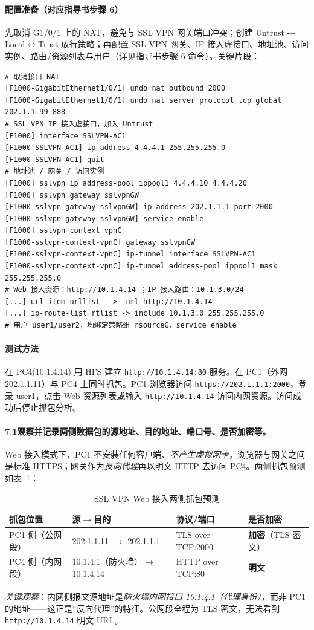 \documentclass[12pt,a4paper]{article}
\begin{document}
\paragraph{配置准备（对应指导书步骤 6）}先取消 G1/0/1 上的 NAT，避免与 SSL VPN 网关端口冲突；创建 Untrust$\leftrightarrow$Local$\leftrightarrow$Trust 放行策略；再配置 SSL VPN 网关、IP 接入虚接口、地址池、访问实例、路由/资源列表与用户（详见指导书步骤 6 命令）。关键片段：
\begin{lstlisting}
# 取消接口 NAT
[F1000-GigabitEthernet1/0/1] undo nat outbound 2000
[F1000-GigabitEthernet1/0/1] undo nat server protocol tcp global 202.1.1.99 888
# SSL VPN IP 接入虚接口，加入 Untrust
[F1000] interface SSLVPN-AC1
[F1000-SSLVPN-AC1] ip address 4.4.4.1 255.255.255.0
[F1000-SSLVPN-AC1] quit
# 地址池 / 网关 / 访问实例
[F1000] sslvpn ip address-pool ippool1 4.4.4.10 4.4.4.20
[F1000] sslvpn gateway sslvpnGW
[F1000-sslvpn-gateway-sslvpnGW] ip address 202.1.1.1 port 2000
[F1000-sslvpn-gateway-sslvpnGW] service enable
[F1000] sslvpn context vpnC
[F1000-sslvpn-context-vpnC] gateway sslvpnGW
[F1000-sslvpn-context-vpnC] ip-tunnel interface SSLVPN-AC1
[F1000-sslvpn-context-vpnC] ip-tunnel address-pool ippool1 mask 255.255.255.0
# Web 接入资源：http://10.1.4.14 ；IP 接入路由：10.1.3.0/24
[...] url-item urllist  ->  url http://10.1.4.14
[...] ip-route-list rtlist -> include 10.1.3.0 255.255.255.0
# 用户 user1/user2，均绑定策略组 rsourceG，service enable
\end{lstlisting}

\paragraph{测试方法}在 PC4(10.1.4.14) 用 HFS 建立 \texttt{http://10.1.4.14:80} 服务。在 PC1（外网 202.1.1.11）与 PC4 上同时抓包。PC1 浏览器访问 \texttt{https://202.1.1.1:2000}，登录 user1，点击 Web 资源列表或输入 \texttt{http://10.1.4.14} 访问内网资源。访问成功后停止抓包分析。

\paragraph{7.1\quad 观察并记录两侧数据包的源地址、目的地址、端口号、是否加密等。}
Web 接入模式下，PC1 不安装任何客户端、\emph{不产生虚拟网卡}，浏览器与网关之间是标准 HTTPS；网关作为\emph{反向代理}再以明文 HTTP 去访问 PC4。两侧抓包预测如表~\ref{tab:webvpn}：
\begin{table}[H]
\centering\caption{SSL VPN Web 接入两侧抓包预测}\label{tab:webvpn}
\small
\begin{tabular}{@{}p{3.2cm}p{3.2cm}p{3.6cm}p{2.4cm}@{}}
\toprule
抓包位置 & 源$\to$目的 & 协议/端口 & 是否加密 \\
\midrule
PC1 侧（公网段） & 202.1.1.11 $\to$ 202.1.1.1 & TLS over TCP:2000 & \textbf{加密}（TLS 密文） \\
PC4 侧（内网段） & 10.1.4.1（防火墙）$\to$ 10.1.4.14 & HTTP over TCP:80 & \textbf{明文} \\
\bottomrule
\end{tabular}
\end{table}
\emph{关键观察}：内网侧报文源地址是\emph{防火墙内网接口 10.1.4.1（代理身份）}，而非 PC1 的地址——这正是“反向代理”的特征。公网段全程为 TLS 密文，无法看到 \texttt{http://10.1.4.14} 明文 URL。
\end{document}
